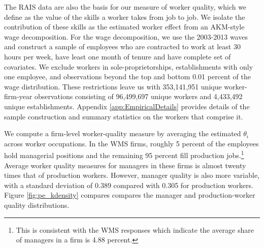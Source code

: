 The RAIS data are also the basis for our measure of worker quality, which we define as the value of the skills a worker takes from job to job.  We isolate the contribution of these skills as the estimated worker effect from an AKM-style wage decomposition.  For the wage decomposition, we use the 2003-2013 waves and construct a sample of employees who are contracted to work at least 30 hours per week, have least one month of tenure and have complete set of covariates. We exclude workers in sole-proprietorships, establishments with only one employee, and observations beyond the top and bottom 0.01 percent of the wage distribution. These restrictions leave us with 353,141,951 unique worker-firm-year observations consisting of 96,499,697 unique workers and 4,433,492 unique establishments. Appendix \ref{app:EmpiricalDetails} provides details of the sample construction and summary statistics on the workers that comprise it.



We compute a firm-level worker-quality measure by averaging the estimated $\theta_i$ across worker occupations. In the WMS firms, roughly 5 percent of the employees hold managerial positions and the remaining 95 percent fill production jobs.\footnote{This is consistent with the WMS responses which indicate the average share of managers in a firm is 4.88 percent.} Average worker quality measures for managers in these firms is almost twenty times that of production workers.  However, manager quality is also more variable, with a standard deviation of 0.389 compared with 0.305 for production workers. Figure \ref{fig:pe_kdensity} compares compares the manager and production-worker quality distributions.

